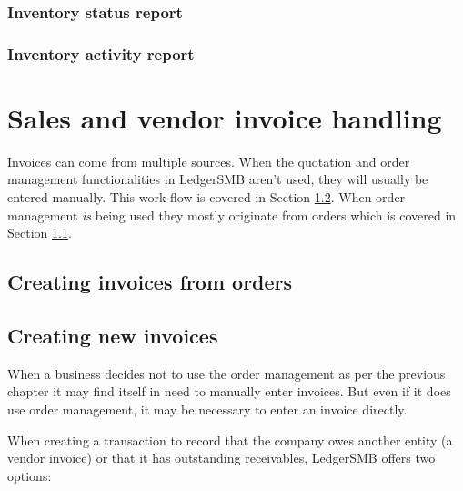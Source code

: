 \subsection{Inventory status report}

\subsection{Inventory activity report}




\chapter{Sales and vendor invoice handling}
\label{cha-workflows-invoicing}

Invoices can come from multiple sources. When the quotation and order
management functionalities in LedgerSMB aren't used, they will usually
be entered manually. This work flow is covered in Section
\ref{sec-workflows-invoicing-manual-entry}.
When order management \emph{is} being used they mostly originate from orders
which is covered in Section \ref{sec-workflows-invoicing-from-orders}.



\section{Creating invoices from orders}
\label{sec-workflows-invoicing-from-orders}





\section{Creating new invoices}
\label{sec-workflows-invoicing-manual-entry}



When a business decides not to use the order management as per the previous
chapter it may find itself in need to manually enter invoices. But even
if it does use order management, it may be necessary to enter an invoice
directly.

When creating a transaction to record that the company owes another
entity (a vendor invoice) or that it has outstanding receivables,
LedgerSMB offers two options:

